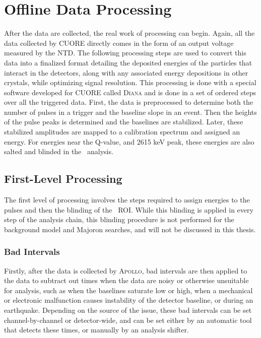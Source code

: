 \section{Offline Data Processing}
After the data are collected, the real work of processing can begin.
Again, all the data collected by CUORE directly comes in the form of an output voltage measured by the NTD.
The following processing steps are used to convert this data into a finalized format detailing the deposited energies of the particles that interact in the detectors, along with any associated energy depositions in other crystals, while optimizing signal resolution.
This processing is done with a special software developed for CUORE called \textsc{Diana} and is done in a set of ordered steps over all the triggered data.
First, the data is preprocessed to determine both the number of pulses in a trigger and the baseline slope in an event. 
Then the heights of the pulse peaks is determined and the baselines are stabilized.
Later, these stabilized amplitudes are mapped to a calibration spectrum and assigned an energy.
For energies near the \zeronubb Q-value, and 2615 keV peak, these energies are also salted and blinded in the \zeronubb~analysis.

\subsection*{First-Level Processing}
The first level of processing involves the steps required to assign energies to the pulses and then the blinding of the \zeronubb~ROI.
While this blinding is applied in every step of the analysis chain, this blinding procedure is not performed for the background model and Majoron searches, and will not be discussed in this thesis.

\subsubsection*{Bad Intervals}
Firstly, after the data is collected by \textsc{Apollo}, bad intervals are then applied to the data to subtract out times when the data are noisy or otherwise unsuitable for analysis, such as when the baselines saturate low or high, when a mechanical or electronic malfunction causes instability of the detector baseline, or during an earthquake.
Depending on the source of the issue, these bad intervals can be set channel-by-channel or detector-wide, and can be set either by an automatic tool that detects these times, or manually by an analysis shifter.


